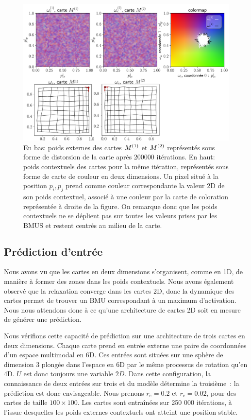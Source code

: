 \documentclass[../main]{subfiles}
\begin{document}
\begin{figure}[H]
	\centering\includegraphics[width=\textwidth]{w_cub_rc002.pdf}
	\caption{En bas: poids externes des cartes $M^{({1})}$ et $M^{({2})}$ représentés sous forme de distorsion de la carte après 200000 itérations.
	En haut: poids contextuels des cartes pour la même itération, représentés sous forme de carte de couleur en deux dimensions. Un pixel situé à la position $p_i,p_j$ prend comme couleur correspondante la valeur 2D de son poids contextuel, associé à une couleur par la carte de coloration représentée à droite de la figure.
	On remarque donc que les poids contextuels ne se déplient pas sur toutes les valeurs prises par les BMUS et restent centrés au milieu de la carte. \label{fig:2som_cub_wc}}

\end{figure}

\subsection{Prédiction d'entrée \label{par:pred2D}}

Nous avons vu que les cartes en deux dimensions s'organisent, comme en 1D, de manière à former des zones dans les poids contextuels.  Nous avons également observé que la relaxation converge dans les cartes 2D, donc la dynamique des cartes permet de trouver un BMU correspondant à un maximum d'activation.
Nous nous attendons donc à ce qu'une architecture de cartes 2D soit en mesure de générer une prédiction.

Nous vérifions cette capacité de prédiction sur une architecture de trois cartes en deux dimensions. 
Chaque carte prend en entrée externe une paire de coordonnées d'un espace multimodal en 6D. Ces entrées sont situées sur une sphère de dimension 3 plongée dans l'espace en 6D par le même processus de rotation qu'en 4D. $U$ est donc toujours une variable $2D$. 
Dans cette configuration, la connaissance de deux entrées sur trois et du modèle détermine la troisième~: la prédiction est donc envisageable.
Nous prenons $r_e = 0.2$ et $r_c = 0.02$, pour des cartes de taille $100 \times 100$. Les cartes sont entraînées sur 250 000 itérations, à l'issue desquelles les poids externes contextuels ont atteint une position stable.
\end{document}
